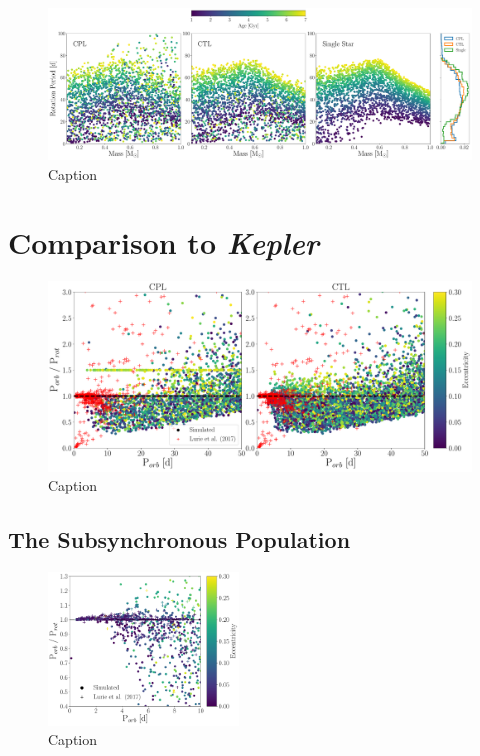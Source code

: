 \documentclass[twocolumn]{aastex61}
\newcommand{\kepler}[0]{\textit{Kepler}\xspace}
\begin{document}
\begin{figure}[t]
	\includegraphics[width=\textwidth]{../Plots/protDist.pdf}
   \caption{Caption}%
    \label{fig:protDist}%
\end{figure}


\section{Comparison to \kepler} \label{sec:kepler}

\begin{figure}[t]
	\includegraphics[width=\textwidth]{../Plots/lurieFig7.pdf}
   \caption{Caption}%
    \label{fig:lurie7}%
\end{figure}

\subsection{The Subsynchronous Population} \label{sec:subsync}

\begin{figure}
	\includegraphics[width=0.45\textwidth]{../Plots/subsync.pdf}
   \caption{Caption}%
    \label{fig:subsync}%
\end{figure}
\end{document}
